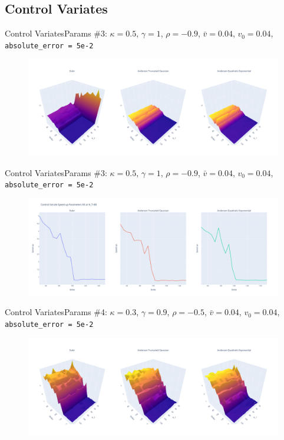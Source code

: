 \subsection{Control Variates}
    \begin{frame}{Control Variates}{Params \#3: $\kappa = 0.5$, $\gamma = 1$, $\rho = -0.9$, $\bar v = 0.04$, $v_0 = 0.04$, \texttt{absolute\_error = 5e-2}}
        \begin{figure}
            \includegraphics[width=\textwidth]{part5/pictures/surf_3.pdf}
        \end{figure}
    \end{frame}

    \begin{frame}{Control Variates}{Params \#3: $\kappa = 0.5$, $\gamma = 1$, $\rho = -0.9$, $\bar v = 0.04$, $v_0 = 0.04$, \texttt{absolute\_error = 5e-2}}
        \begin{figure}
            \includegraphics[width=\textwidth]{part5/pictures/pot_3.pdf}
        \end{figure}
    \end{frame}

    \begin{frame}{Control Variates}{Params \#4: $\kappa = 0.3$, $\gamma = 0.9$, $\rho = -0.5$, $\bar v = 0.04$, $v_0 = 0.04$, \texttt{absolute\_error = 5e-2}}
        \begin{figure}
            \includegraphics[width=\textwidth]{part5/pictures/surf_4.pdf}
        \end{figure}
    \end{frame}

